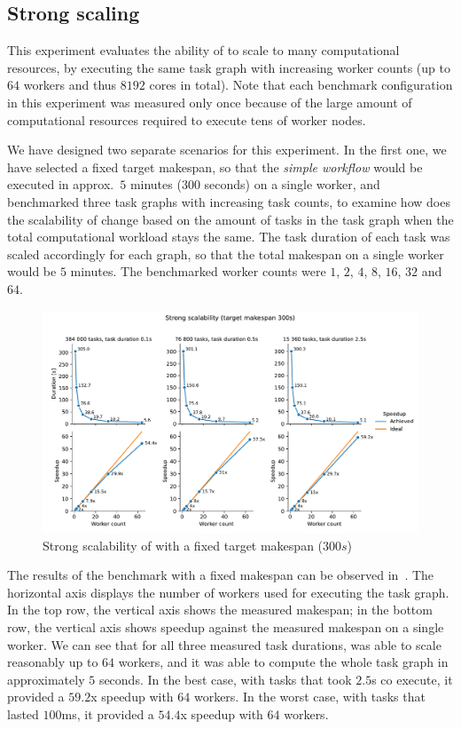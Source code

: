 \subsection{Strong scaling}
\label{sec:hq-exp-scalability}
This experiment evaluates the ability of \hyperqueue{} to scale to many computational
resources, by executing the same task graph with increasing worker counts (up to
$64$ workers and thus $8192$ cores in total). Note that each
benchmark configuration in this experiment was measured only once because of the large amount of
computational resources required to execute tens of worker nodes.

We have designed two separate scenarios for this experiment. In the first one, we have selected a
fixed target makespan, so that the \emph{simple workflow} would be executed in approx.\
$5$ minutes ($300$ seconds) on a single worker, and benchmarked
three task graphs with increasing task counts, to examine how does the scalability of
\hyperqueue{} change based on the amount of tasks in the task graph when the total
computational workload stays the same. The task duration of each task was scaled accordingly for
each graph, so that the total makespan on a single worker would be $5$ minutes.
The benchmarked worker counts were $1$, $2$,
$4$, $8$, $16$, $32$ and
$64$.

\begin{figure}[h]
	\centering
	\includegraphics[width=\textwidth]{imgs/hq/charts/scalability-fixed-makespan}
	\caption{Strong scalability of \hyperqueue{} with a fixed target makespan ($300s$)}
	\label{fig:hq-scalability-fixed-makespan}
\end{figure}

The results of the benchmark with a fixed makespan can be observed in~. The
horizontal axis displays the number of workers used for executing the task graph. In the top row,
the vertical axis shows the measured makespan; in the bottom row, the vertical axis shows speedup
against the measured makespan on a single worker. We can see that for all three measured task
durations, \hyperqueue{} was able to scale reasonably up to $64$
workers, and it was able to compute the whole task graph in approximately $5$
seconds. In the best case, with tasks that took $2.5$s co execute, it provided a
$59.2$x speedup with $64$ workers. In the worst case, with tasks
that lasted $100$ms, it provided a $54.4$x speedup with
$64$ workers.

